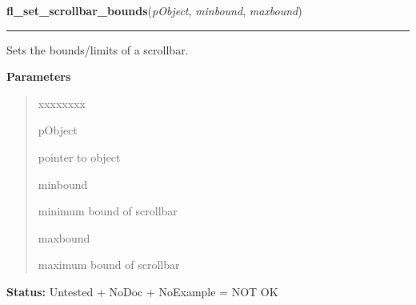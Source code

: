 \hspace{.8\funcindent}\begin{boxedminipage}{\funcwidth}

    \raggedright \textbf{fl\_set\_scrollbar\_bounds}(\textit{pObject}, \textit{minbound}, \textit{maxbound})

    \vspace{-1.5ex}

    \rule{\textwidth}{0.5\fboxrule}
\setlength{\parskip}{2ex}
    Sets the bounds/limits of a scrollbar.

\setlength{\parskip}{1ex}
      \textbf{Parameters}
      \vspace{-1ex}

      \begin{quote}
        \begin{Ventry}{xxxxxxxx}

          \item[pObject]

          pointer to object

          \item[minbound]

          minimum bound of scrollbar

          \item[maxbound]

          maximum bound of scrollbar

        \end{Ventry}

      \end{quote}

\textbf{Status:} Untested + NoDoc + NoExample = NOT OK



    \end{boxedminipage}

    \label{xformslib:library:fl_get_scrollbar_bounds}

    \vspace{0.5ex}

